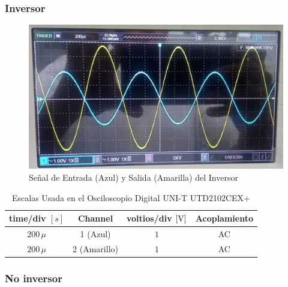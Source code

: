     \subsubsection{Inversor}
        \begin{figure}[H]
            \centering
            \renewcommand{\figurename}{Imagen}
            \setcounter{figure}{4}
            \includegraphics[width=15cm]{Imagenes/exp_inversor.png}
            \caption{Señal de Entrada (Azul) y Salida (Amarilla) del Inversor}
            \label{fig:exp_inversor}
        \end{figure}
    
        \begin{table}[H]
            \centering
            \begin{tabular}{|c|c|c|c|}
                \hline
                \textbf{time/div} $[s]$ & \textbf{Channel} & \textbf{voltios/div $[\volt]$} & \textbf{Acoplamiento} \\ \hline
                $200 \, \mu$ & 1 (Azul) &   $1 $ & AC \\ \hline
                $200 \, \mu$ & 2 (Amarillo)  &   $1 $ & AC \\ \hline  
            \end{tabular}
            \caption{Escalas Usada en el Osciloscopio Digital UNI-T UTD2102CEX+}
            \label{tab:escala_inversor}
        \end{table}

    \subsubsection{No inversor}

